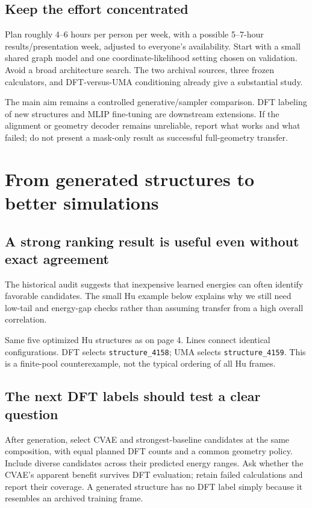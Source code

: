 \subsection*{Keep the effort concentrated}
Plan roughly 4--6 hours per person per week, with a possible 5--7-hour results/presentation week, adjusted to everyone's availability. Start with a small shared graph model and one coordinate-likelihood setting chosen on validation. Avoid a broad architecture search. The two archival sources, three frozen calculators, and DFT-versus-UMA conditioning already give a substantial study.

The main aim remains a controlled generative/sampler comparison. DFT labeling of new structures and MLIP fine-tuning are downstream extensions. If the alignment or geometry decoder remains unreliable, report what works and what failed; do not present a mask-only result as successful full-geometry transfer.

\clearpage
\section{From generated structures to better simulations}

\subsection*{A strong ranking result is useful even without exact agreement}
The historical audit suggests that inexpensive learned energies can often identify favorable candidates. The small Hu example below explains why we still need low-tail and energy-gap checks rather than assuming transfer from a high overall correlation.

\begin{center}\end{center}
{\small\textcolor{slate}{Same five optimized Hu structures as on page 4. Lines connect identical configurations. DFT selects \texttt{structure\_4158}; UMA selects \texttt{structure\_4159}. This is a finite-pool counterexample, not the typical ordering of all Hu frames.}}

\subsection*{The next DFT labels should test a clear question}
After generation, select CVAE and strongest-baseline candidates at the same composition, with equal planned DFT counts and a common geometry policy. Include diverse candidates across their predicted energy ranges. Ask whether the CVAE's apparent benefit survives DFT evaluation; retain failed calculations and report their coverage. A generated structure has no DFT label simply because it resembles an archived training frame.

